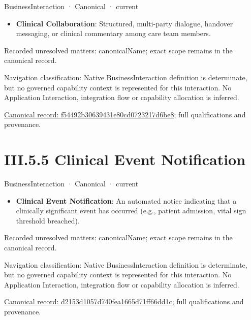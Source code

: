\label{element:f54492b30639431e80cd0723217d6be8}
{\small BusinessInteraction · Canonical · current}\par

\begin{itemize}


\item \textbf{Clinical Collaboration}: Structured, multi-party dialogue, handover messaging, or clinical commentary among care team members.

\end{itemize}

{\small Recorded unresolved matters: canonicalName; exact scope remains in the canonical record.}\par
{\small Navigation classification: Native BusinessInteraction definition is determinate, but no governed capability context is represented for this interaction. No Application Interaction, integration flow or capability allocation is inferred.}\par
{\footnotesize \href{../../../../continuum/business/business-interaction/f54492b30639431e80cd0723217d6be8.md}{Canonical record: f54492b30639431e80cd0723217d6be8}; full qualifications and provenance.}\par
\section*{III.5.5 Clinical Event Notification}
\label{navigation:III.5.5}

\label{element:d2153d1057d740fea1665d71ff66dd1c}
{\small BusinessInteraction · Canonical · current}\par

\begin{itemize}


\item \textbf{Clinical Event Notification}: An automated notice indicating that a clinically significant event has occurred (e.g., patient admission, vital sign threshold breached).

\end{itemize}

{\small Recorded unresolved matters: canonicalName; exact scope remains in the canonical record.}\par
{\small Navigation classification: Native BusinessInteraction definition is determinate, but no governed capability context is represented for this interaction. No Application Interaction, integration flow or capability allocation is inferred.}\par
{\footnotesize \href{../../../../continuum/business/business-interaction/d2153d1057d740fea1665d71ff66dd1c.md}{Canonical record: d2153d1057d740fea1665d71ff66dd1c}; full qualifications and provenance.}\par

